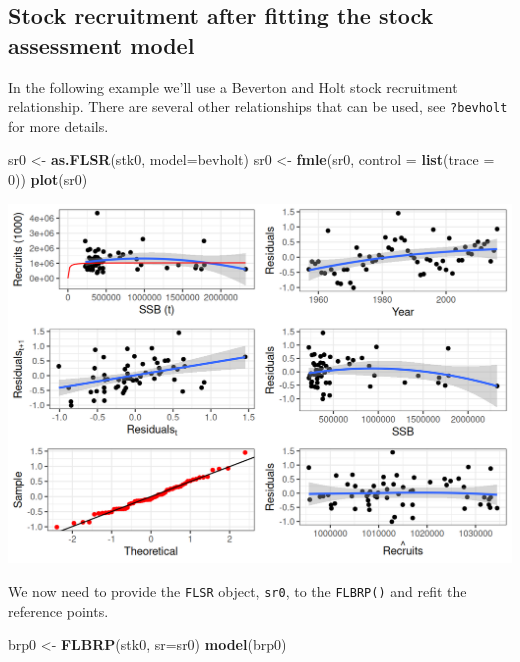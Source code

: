 \documentclass[
]{book}
\newenvironment{Shaded}{\begin{snugshade}}{\end{snugshade}}
\newcommand{\AttributeTok}[1]{\textcolor[rgb]{0.13,0.29,0.53}{#1}}
\newcommand{\DecValTok}[1]{\textcolor[rgb]{0.00,0.00,0.81}{#1}}
\newcommand{\FunctionTok}[1]{\textcolor[rgb]{0.13,0.29,0.53}{\textbf{#1}}}
\newcommand{\NormalTok}[1]{#1}
\newcommand{\OtherTok}[1]{\textcolor[rgb]{0.56,0.35,0.01}{#1}}
\begin{document}
\hypertarget{stock-recruitment-after-fitting-the-stock-assessment-model}{%
\subsection{Stock recruitment after fitting the stock assessment model}\label{stock-recruitment-after-fitting-the-stock-assessment-model}}

In the following example we'll use a Beverton and Holt stock recruitment relationship. There are several other relationships that can be used, see \texttt{?bevholt} for more details.

\begin{Shaded}
\begin{Highlighting}[]
\NormalTok{sr0 }\OtherTok{\textless{}{-}} \FunctionTok{as.FLSR}\NormalTok{(stk0, }\AttributeTok{model=}\NormalTok{bevholt)}
\NormalTok{sr0 }\OtherTok{\textless{}{-}} \FunctionTok{fmle}\NormalTok{(sr0, }\AttributeTok{control =} \FunctionTok{list}\NormalTok{(}\AttributeTok{trace =} \DecValTok{0}\NormalTok{))}
\FunctionTok{plot}\NormalTok{(sr0)}
\end{Highlighting}
\end{Shaded}

\includegraphics{_bookdown_files/_main_files/figure-html/unnamed-chunk-103-1.png}

We now need to provide the \texttt{FLSR} object, \texttt{sr0}, to the \texttt{FLBRP()} and refit the reference points.

\begin{Shaded}
\begin{Highlighting}[]
\NormalTok{brp0 }\OtherTok{\textless{}{-}} \FunctionTok{FLBRP}\NormalTok{(stk0, }\AttributeTok{sr=}\NormalTok{sr0)}
\FunctionTok{model}\NormalTok{(brp0)}
\end{Highlighting}
\end{Shaded}
\end{document}
